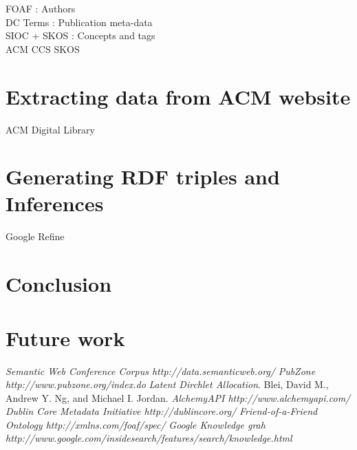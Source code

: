 \documentclass[a4paper,12pt]{article}
\begin{document}
FOAF :  Authors\\
DC Terms :  Publication meta-data\\
SIOC + SKOS : Concepts and tags\\
ACM CCS SKOS
	
\section{Extracting data from ACM website}
ACM Digital Library

\section{Generating RDF triples and Inferences}
	Google Refine
\section{Conclusion}

\section{Future work}

\begin{thebibliography}{99}

 \textit{Semantic Web Conference Corpus http://data.semanticweb.org/ }
 \textit{PubZone http://www.pubzone.org/index.do}
 \textit{Latent Dirchlet Allocation}. Blei, David M., Andrew Y. Ng, and Michael I. Jordan.
 \textit{AlchemyAPI http://www.alchemyapi.com/}
 \textit{Dublin Core Metadata Initiative http://dublincore.org/ }
 \textit{Friend-of-a-Friend Ontology http://xmlns.com/foaf/spec/}
 \textit{Google Knowledge grah http://www.google.com/insidesearch/features/search/knowledge.html}
\end{thebibliography}
\end{document}
